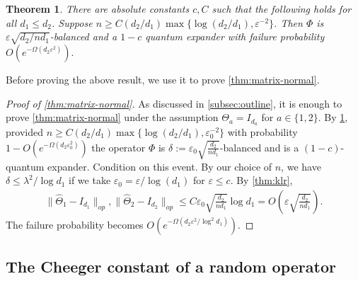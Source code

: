 \documentclass{article}
\newtheorem{theorem}{Theorem}
\newcommand\eps{\varepsilon}
\begin{document}
\begin{theorem}\label{thm:operator-cheeger}
There are absolute constants $c, C$ such that the following holds for all $d_1 \leq d_2$. Suppose $n \geq C (d_2/d_1) \max\{\log (d_2/d_1),  \eps^{-2}\} $. Then $\Phi$ is $\eps \sqrt{d_2/n d_1}$-balanced and a $1 - c$ quantum expander with failure probability $O(e^{ - \Omega( d_2 \eps^2)}).$
\end{theorem}

Before proving the above result, we use it to prove \cref{thm:matrix-normal}.

\begin{proof}[Proof of \cref{thm:matrix-normal}] As discussed in \cref{subsec:outline}, it is enough to prove \cref{thm:matrix-normal} under the assumption $\Theta_a = I_{d_a}$ for $a \in \{1,2\}$. By \cref{thm:operator-cheeger}, provided $n \geq C (d_2/d_1) \max\{\log (d_2/d_1),  \eps_0^{-2}\} $ with probability $1 - O(e^{ - \Omega( d_2 \eps_0^2)})$ the operator $\Phi$ is $\delta:=\eps_0  \sqrt{\frac{d_2}{n d_1}}$-balanced and is a $(1 - c)$-quantum expander. Condition on this event. By our choice of $n$, we have $\delta \leq \lambda^2/\log d_1$ if we take $\eps_0 = \eps/\log(d_1)$ for $\eps \leq c$. By \cref{thm:klr},
\begin{gather*} \| \widehat{\Theta}_1 - I_{d_1}\|_{op}, \| \widehat{\Theta}_2 - I_{d_2}\|_{op} \leq C \eps_0 \sqrt{\frac{d_2}{n d_1}} \log d_1 = O\left(\eps \sqrt{\frac{d_2}{n d_1}}\right).\end{gather*}
The failure probability becomes $O(e^{ - \Omega( d_2 \eps^2/\log^2 d_1)})$.
\end{proof}











\subsection{The Cheeger constant of a random operator}
\end{document}
